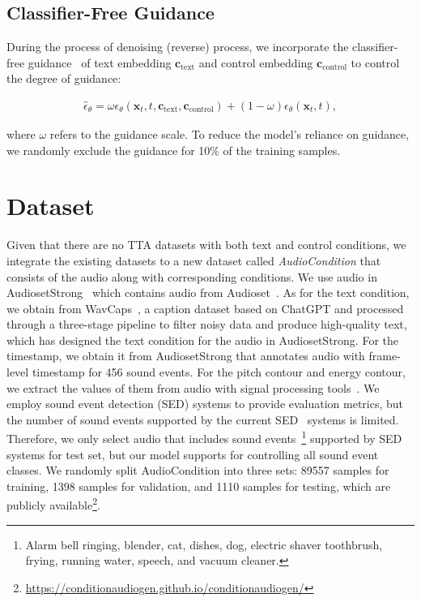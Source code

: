 \documentclass[letterpaper]{article} %
\begin{document}
\subsection{Classifier-Free Guidance}

During the process of denoising (reverse) process, we incorporate the classifier-free guidance~\cite{jonathan2022classfree} of text embedding $\mathbf{c}_{\text{text}}$ and control embedding $\mathbf{c}_{\text{control}}$ to control the degree of guidance:

\begin{align}
\hat{\epsilon}_{\theta} = \omega\epsilon_{\theta}(\mathbf{x}_{t}, t, \mathbf{c}_{\text{text}}, \mathbf{c}_{\text{control}}) + (1 - \omega)\epsilon_{\theta}(\mathbf{x}_{t}, t), 
\end{align}

where $\omega$ refers to the guidance scale. To reduce the model's reliance on guidance, we randomly exclude the guidance for 10\% of the training samples. 

\section{Dataset}

Given that there are no TTA datasets with both text and control conditions, we integrate the existing datasets to a new dataset called \textit{AudioCondition} that consists of the audio along with corresponding conditions. We use audio in AudiosetStrong~\cite{hershey2021audiosetstrong} which contains audio from Audioset~\cite{gemmeke2017audioset}. As for the text condition, we obtain from WavCaps~\cite{mei2023wavecaps}, a caption dataset based on ChatGPT and processed through a three-stage pipeline to filter noisy data and produce high-quality text, which has designed the text condition for the audio in AudiosetStrong. For the timestamp, we obtain it from AudiosetStrong that annotates audio with frame-level timestamp for 456 sound events. For the pitch contour and energy contour, we extract the values of them from audio with signal processing tools~\cite{world2016morise,librosa2015masanori}. We employ sound event detection (SED) systems to provide evaluation metrics, but the number of sound events supported by the current SED~\cite{janek2021sased, janek2020fbsedt, janek2022pssed} systems is limited. Therefore, we only select audio that includes sound events~\footnote{Alarm bell ringing, blender, cat, dishes, dog, electric shaver toothbrush, frying, running water, speech, and vacuum cleaner.} 
supported by SED systems for test set, but our model supports for controlling all sound event classes. We randomly split AudioCondition into three sets: 89557 samples for training, 1398 samples for validation, and 1110 samples for testing, which are publicly available\footnote{\url{https://conditionaudiogen.github.io/conditionaudiogen/}}.
\end{document}
